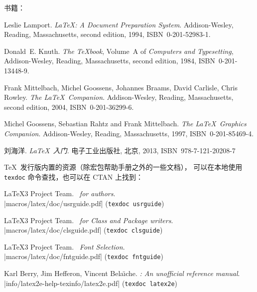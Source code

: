 \begin{thebibliography}{20}

\item[\textbullet] 书籍：

 Leslie Lamport. 
  \newblock \emph{\LaTeX: A Document Preparation System}.  
  \newblock Addison-Wesley, Reading, Massachusetts, second edition, 1994, ISBN~0-201-52983-1.
  
 Donald~E. Knuth. 
  \newblock \textit{The \TeX book}, Volume~A of \textit{Computers and Typesetting}, 
  \newblock Addison-Wesley, Reading, Massachusetts, second edition, 1984, ISBN~0-201-13448-9.

 Frank Mittelbach, Michel Goossens, Johannes Braams, David Carlisle, Chris Rowley. 
  \newblock \emph{The \LaTeX\ Companion}.  
  \newblock Addison-Wesley, Reading, Massachusetts, second edition, 2004, ISBN~0-201-36299-6.

 Michel Goossens, Sebastian Rahtz and Frank Mittelbach. 
  \newblock \emph{The \LaTeX\ Graphics Companion}. 
  \newblock Addison-Wesley, Reading, Massachusetts, 1997, ISBN~0-201-85469-4.

 刘海洋.
  \newblock \emph{\LaTeX\ 入门}. 
  \newblock 电子工业出版社, 北京, 2013, ISBN~978-7-121-20208-7 

\item[\textbullet] \TeX\ 发行版内置的资源（除宏包帮助手册之外的一些文档），
  可以在本地使用 \texttt{texdoc} 命令查找，也可以在 CTAN 上找到：

 \LaTeX3 Project Team.
  \newblock \emph{\LaTeXe\ for authors}.\\
  \newblock \CTAN|macros/latex/doc/usrguide.pdf| (\texttt{texdoc usrguide})

 \LaTeX3 Project Team.
  \newblock \emph{\LaTeXe\ for Class and Package writers}. \\
  \newblock \CTAN|macros/latex/doc/clsguide.pdf| (\texttt{texdoc clsguide})

 \LaTeX3 Project Team.
  \newblock \emph{\LaTeXe\ Font Selection}. \\
  \newblock \CTAN|macros/latex/doc/fntguide.pdf| (\texttt{texdoc fntguide})

 Karl Berry, Jim Hefferon, Vincent Bela\"{\i}che.
  \newblock \emph{\LaTeXe: An unofficial reference manual}. \\
  \newblock \CTAN|info/latex2e-help-texinfo/latex2e.pdf| (\texttt{texdoc latex2e})


\end{thebibliography}
